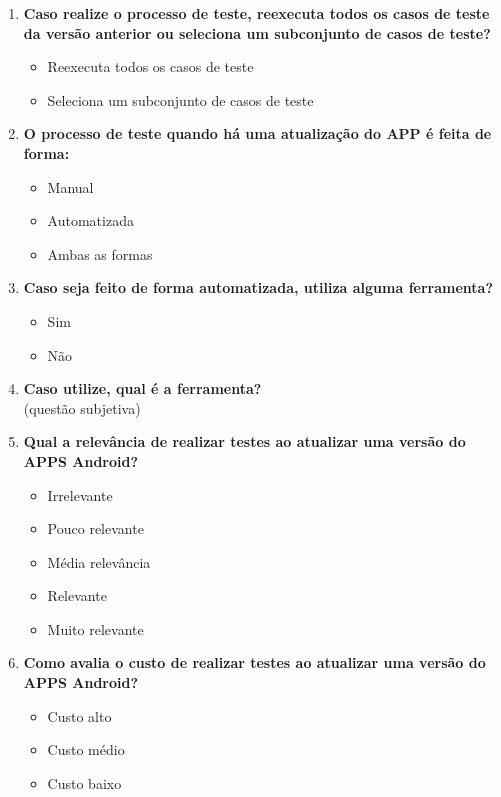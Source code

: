 \begin{enumerate}[label=\bf A\arabic*,leftmargin=1.8cm]
\begin{enumerate}[label= \arabic*]
    \item \textbf{Caso realize o processo de teste, reexecuta todos os casos de teste da versão anterior ou seleciona um subconjunto de casos de teste?}
     \begin{itemize}
         \item Reexecuta todos os casos de teste
         \item Seleciona um subconjunto de casos de teste
     \end{itemize}
     
     \item \textbf{O processo de teste quando há uma atualização do APP é feita de forma:}
     \begin{itemize}
         \item Manual
         \item Automatizada
         \item Ambas as formas
     \end{itemize}
     
    \item \textbf{Caso seja feito de forma automatizada, utiliza alguma ferramenta?}
    \begin{itemize}
        \item Sim
        \item Não
    \end{itemize}
    
    \item \textbf{Caso utilize, qual é a ferramenta?}\\
    (questão subjetiva)
    
    \item \textbf{Qual a relevância de realizar testes ao atualizar uma versão do \ac{APPS} Android?}
    \begin{itemize}
        \item Irrelevante
        \item Pouco relevante
        \item Média relevância
        \item Relevante
        \item Muito relevante
    \end{itemize}
  
    \item \textbf{Como avalia o custo de realizar testes ao atualizar uma versão do \ac{APPS} Android?}
    \begin{itemize}
        \item Custo alto
        \item Custo médio
        \item Custo baixo
    \end{itemize} 


\end{enumerate}
\end{enumerate}
